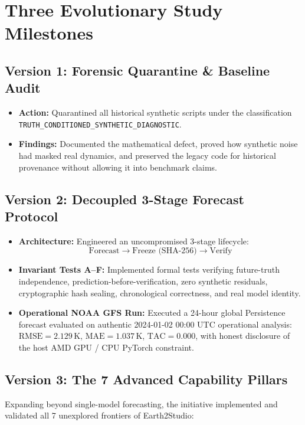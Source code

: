 \documentclass[10pt,twocolumn,a4paper]{article}
\begin{document}
\section{Three Evolutionary Study Milestones}

\subsection{Version 1: Forensic Quarantine \& Baseline Audit}
\begin{itemize}[leftmargin=*,noitemsep]
    \item \textbf{Action:} Quarantined all historical synthetic scripts under the classification \texttt{TRUTH\_CONDITIONED\_SYNTHETIC\_DIAGNOSTIC}.
    \item \textbf{Findings:} Documented the mathematical defect, proved how synthetic noise had masked real dynamics, and preserved the legacy code for historical provenance without allowing it into benchmark claims.
\end{itemize}

\subsection{Version 2: Decoupled 3-Stage Forecast Protocol}
\begin{itemize}[leftmargin=*,noitemsep]
    \item \textbf{Architecture:} Engineered an uncompromised 3-stage lifecycle:
    \begin{equation*}
        \boxed{\text{Forecast}} \longrightarrow \boxed{\text{Freeze (SHA-256)}} \longrightarrow \boxed{\text{Verify}}
    \end{equation*}
    \item \textbf{Invariant Tests A--F:} Implemented formal tests verifying future-truth independence, prediction-before-verification, zero synthetic residuals, cryptographic hash sealing, chronological correctness, and real model identity.
    \item \textbf{Operational NOAA GFS Run:} Executed a 24-hour global Persistence forecast evaluated on authentic 2024-01-02 00:00 UTC operational analysis:
    $\text{RMSE} = 2.129\,\text{K}$, $\text{MAE} = 1.037\,\text{K}$, $\text{TAC} = 0.000$, with honest disclosure of the host AMD GPU / CPU PyTorch constraint.
\end{itemize}

\subsection{Version 3: The 7 Advanced Capability Pillars}
Expanding beyond single-model forecasting, the initiative implemented and validated all 7 unexplored frontiers of Earth2Studio:
\end{document}
